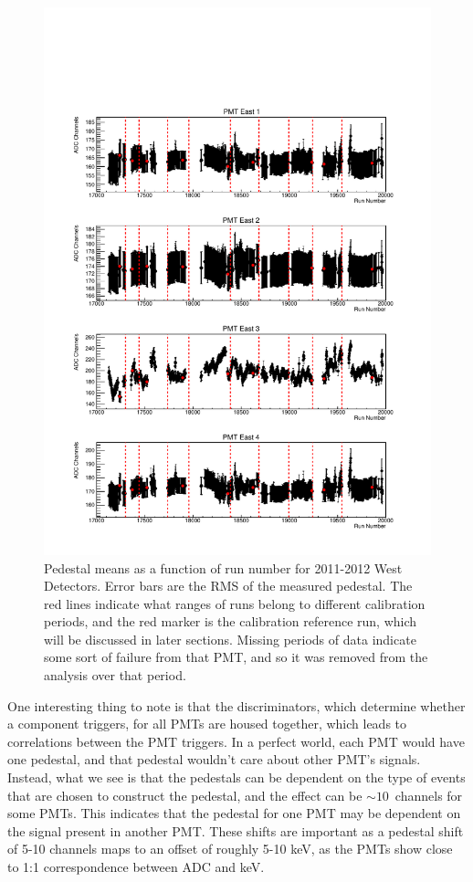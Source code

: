 \begin{figure}[p] 
\centering
\includegraphics[page=2,scale=0.8]{3-UCNAAnalysis/2011-2012_pedestals.pdf}
\caption{Pedestal means as a function of run number for 2011-2012 West Detectors. Error bars are the
  RMS of the measured pedestal. The red lines indicate what ranges of runs belong to
  different calibration periods, and the red marker is the calibration reference run,
  which will be discussed in later sections. Missing periods of data indicate some sort of failure
  from that PMT, and so it was removed from the analysis over that period.}
\label{fig:peds_timeDep}
\end{figure}

One interesting thing to note is that the discriminators, which determine whether
a component triggers,
for all PMTs are housed 
together, which leads to correlations between the PMT triggers. In a perfect world, 
each PMT would have one pedestal, and that pedestal wouldn't care about other PMT's signals.
Instead, what we see is that the pedestals
can be dependent on the type of events that are chosen 
to construct the pedestal, and the effect can be $\sim10$~channels for some PMTs.
This indicates that the pedestal for one PMT may be dependent
on the signal present in another PMT. These shifts are important as a
pedestal shift of 5-10 channels maps to an offset of roughly
5-10 keV, as the PMTs show close to 1:1 correspondence between ADC and keV.

